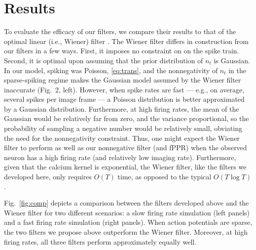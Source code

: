 \documentclass[12pt]{article}
\begin{document}
\section{Results} \label{sec:results} %

To evaluate the efficacy of our filters, we compare their results to that of the optimal linear (i.e., Wiener) filter \cite{Wiener49}.  The Wiener filter differs in construction from our filters in a few ways.  First, it imposes no constraint on on the spike train.  Second, it is optimal upon assuming that the prior distribution of $n_t$ is Gaussian. In our model, spiking was Poisson, \eqref{eq:trans}, and the nonnegativity of $n_t$ in the sparse-spiking regime makes the Gaussian model assumed by the Wiener filter inaccurate (Fig.\ 2, left).  However, when spike rates are fast --- e.g., on average, several spikes per image frame --- a Poisson distribution is better approximated by a Gaussian distribution.  Furthermore, at high firing rates, the mean of the Gaussian would be relatively far from zero, and the variance proportional, so the probability of sampling a negative number would be relatively small, obviating the need for the nonnegativity constraint. Thus, one might expect the Wiener filter to perform as well as our nonnegative filter (and fPPR) when the observed neuron has a high firing rate (and relatively low imaging rate). Furthermore, given that the calcium kernel is exponential, the Wiener filter, like the filters we developed here, only requires $O(T)$ time, as opposed to the typical $O(T\log T)$.

Fig.\ \ref{fig:comp} depicts a comparison between the filters developed above and the Wiener filter for two different scenarios: a slow firing rate simulation (left panels) and a fast firing rate simulation (right panels). When action potentials are sparse, the two filters we propose above outperform the Wiener filter. Moreover, at high firing rates,  all three filters perform approximately equally well. 

\end{document}
